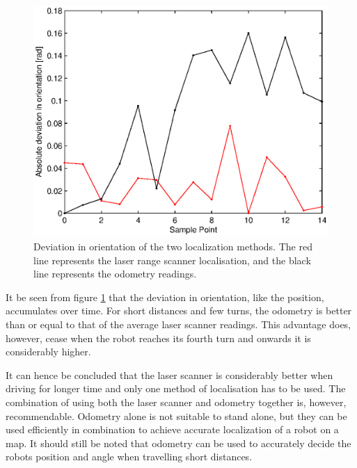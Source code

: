\begin{figure}[H]
\centering
\includegraphics[width = 13cm]{graphics/deviation_angle_encoderVSscanner}
\caption[Deviation in orientation of the two localization methods.]{Deviation in orientation of the two localization methods. The red line represents the laser range scanner localisation, and the black line represents the odometry readings.}
\label{fig:deviationOfEncoderVSScannerAngle}
\end{figure}

It be seen from figure \ref{fig:deviationOfEncoderVSScannerAngle} that the deviation in orientation,
like the position, accumulates over time. 
For short distances and few turns, the odometry is better than or equal to that of the average laser scanner readings.
This advantage does, however, cease when the robot reaches its fourth turn and onwards it is considerably higher.

It can hence be concluded that the laser scanner is considerably better when driving for longer time and only one method of localisation has to be used.
The combination of using both the laser scanner and odometry together is, however, recommendable.
Odometry alone is not suitable to stand alone, but they can be used efficiently in combination to achieve accurate localization of a robot on a map.
It should still be noted that odometry can be used to accurately decide the robots position and angle when travelling short distances.

